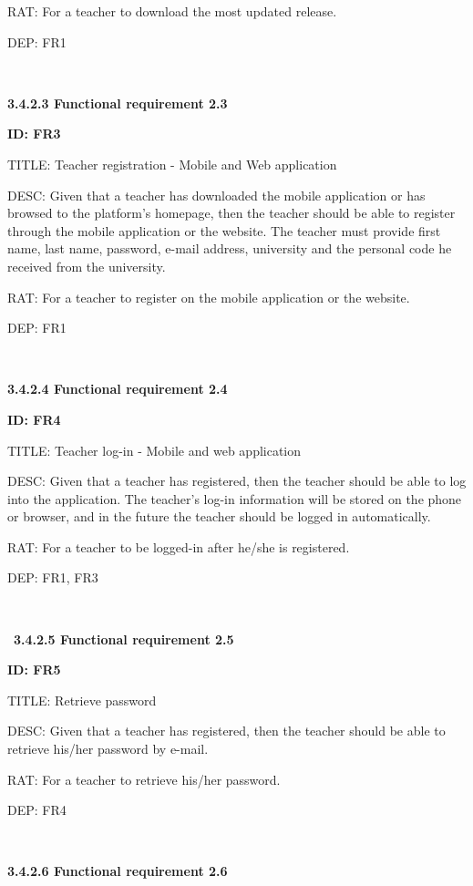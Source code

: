 \documentclass[12pt,a4paper]{article}
\begin{document}
\begin{flushleft}
        RAT: For a teacher to download the most updated release.

        DEP: FR1

        \

        \textbf{3.4.2.3 Functional requirement 2.3}

        \textbf{ID: FR3}

        TITLE: Teacher registration - Mobile and Web application

        DESC: Given that a teacher has downloaded the mobile application or has
        browsed to the platform's homepage, then the teacher should be able to
        register through the mobile application or the website. The teacher must
        provide first name, last name, password, e-mail address, university and
        the personal code he received from the university.

        RAT: For a teacher to register on the mobile application or the website.

        DEP: FR1


        \
\newpage


        \textbf{3.4.2.4 Functional requirement 2.4}

        \textbf{ID: FR4}

        TITLE: Teacher log-in - Mobile and web application

        DESC: Given that a teacher has registered, then the teacher should be
        able to log into the application. The teacher's log-in information will
        be stored on the phone or browser, and in the future the teacher should
        be logged in automatically.

        RAT: For a teacher to be logged-in after he/she is registered.

        DEP: FR1, FR3

        \

        \
\textbf{3.4.2.5 Functional requirement 2.5}

        \textbf{ID: FR5}

        TITLE: Retrieve password

        DESC: Given that a teacher has registered, then the teacher should be
        able to retrieve his/her password by e-mail.

        RAT: For a teacher to retrieve his/her password.

        DEP: FR4

        \

        \textbf{3.4.2.6 Functional requirement 2.6}


\end{flushleft}
\end{document}
